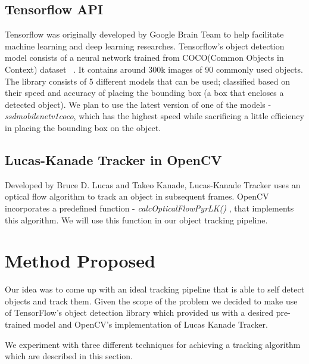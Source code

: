 \documentclass[10pt,twocolumn,letterpaper]{article}
\begin{document}
\subsection{Tensorflow API}

Tensorflow was originally developed by Google Brain Team to help facilitate machine learning and deep learning researches. Tensorflow's object detection model consists of a neural network trained from COCO(Common Objects in Context) dataset ~\cite{coco}. It contains around 300k images of 90 commonly used objects. The library consists of 5 different models that can be used; classified based on their speed and accuracy of placing the bounding box (a box that encloses a detected object). We plan to use the latest version of one of the models - \textit{ssd\textunderscore mobilenet\textunderscore v1\textunderscore coco}, which has the highest speed while sacrificing a little efficiency in placing the bounding box on the object.

\subsection{Lucas-Kanade Tracker in OpenCV}

Developed by Bruce D. Lucas and Takeo Kanade, Lucas-Kanade Tracker uses an optical flow algorithm to track an object in subsequent frames. OpenCV incorporates a predefined function - \textit{calcOpticalFlowPyrLK()} , that implements this algorithm. We will use this function in our object tracking pipeline.





\section{Method Proposed}


Our idea was to come up with an ideal tracking pipeline that is able to self detect objects and track them. Given the scope of the problem we decided to make use of TensorFlow's object detection library which provided us with a desired pre-trained model and OpenCV's implementation of Lucas Kanade Tracker.  

We experiment with three different techniques for achieving a tracking algorithm which are described in this section.
\end{document}
